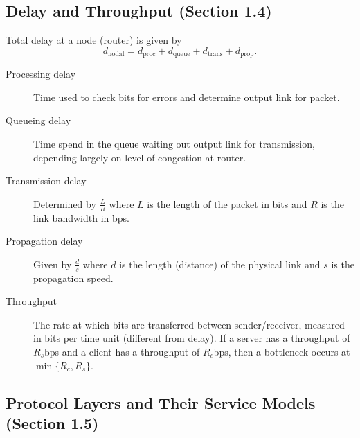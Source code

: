 \documentclass{article}
\begin{document}
\subsection*{Delay and Throughput (Section 1.4)}

Total delay at a node (router) is given by
\[
    d_{\text{nodal}} = d_{\text{proc}} + d_{\text{queue}} + d_{\text{trans}} + d_{\text{prop}}.
\]
\begin{description}
    \item[Processing delay]
    Time used to check bits for errors and determine output link for packet.
    
    \item[Queueing delay]
    Time spend in the queue waiting out output link for transmission, depending largely on level of
    congestion at router.
    
    \item[Transmission delay]
    Determined by $\frac LR$ where $L$ is the length of the packet in bits and $R$ is the link 
    bandwidth in bps.
    
    \item[Propagation delay]
    Given by $\frac ds$ where $d$ is the length (distance) of the physical link and $s$ is the 
    propagation speed.
    
    \item[Throughput]
    The rate at which bits are transferred between sender/receiver, measured in bits per time unit 
    (different from delay). If a server has a throughput of $R_s$bps and a client has a throughput of
    $R_c$bps, then a bottleneck occurs at $\min\{R_c,R_s\}.$
\end{description}


\subsection*{Protocol Layers and Their Service Models (Section 1.5)}
\end{document}
